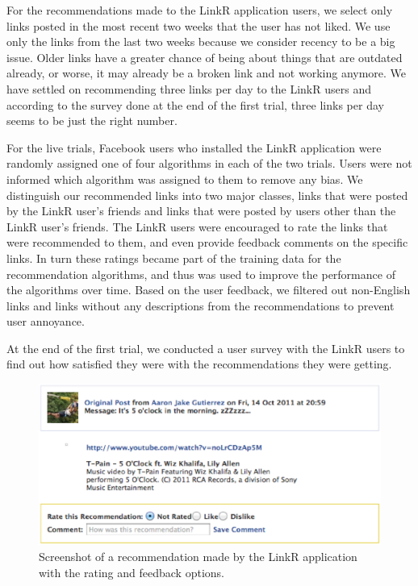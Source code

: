 For the recommendations made to the LinkR application users,  we select only links posted in the most recent two weeks that the user has not liked. We use only the links from the last two weeks because we consider recency to be a big issue. Older links have a greater chance of being about things that are outdated already, or worse, it may already be a broken link and not working anymore. We have settled on recommending three links per day to the LinkR users and according to the survey done at the end of the first trial, three links per day seems to be just the right number.

For the live trials, Facebook users who installed the LinkR application were randomly assigned one of four algorithms in each of the two trials. Users were not informed which algorithm was assigned to them to remove any bias. We distinguish our recommended links into two major classes, links that were posted by the LinkR user's friends and links that were posted by users other than the LinkR user's friends. The LinkR users were encouraged to rate the links that were recommended to them, and even provide feedback comments on the specific links. In turn these ratings became part of the training data for the recommendation algorithms, and thus was used to improve the performance of the algorithms over time. Based on the user feedback, we filtered out non-English links and links without any descriptions from the recommendations to prevent user annoyance.

At the end of the first trial, we conducted a user survey with the LinkR users to find out how satisfied they were with the recommendations they were getting.

\begin{figure}
\centering
\includegraphics[scale=0.5]{img/linkr_rating.eps}
\caption{Screenshot of a recommendation made by the LinkR application with the rating and feedback options.}
 \end{figure}
 
